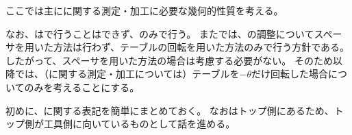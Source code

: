 

ここでは主に\Dimple に関する測定・加工に必要な幾何的性質を考える。

なお、\DimpleMilling は\MMC で行うことはできず、\DMC のみで行う。
また\DMC では、\AlocationLength の調整についてスペーサを用いた方法は行わず、テーブルの回転を用いた方法のみで行う方針である。
したがって、スペーサを用いた方法の場合は考慮する必要がない。
そのため以降では、（\Dimple に関する測定・加工については）テーブルを$-\theta$だけ回転した場合についてのみを考えることにする。



初めに、\Dimple に関する表記を簡単にまとめておく。
なお\Dimple はトップ側にあるため、トップ側が工具側に向いているものとして話を進める。

